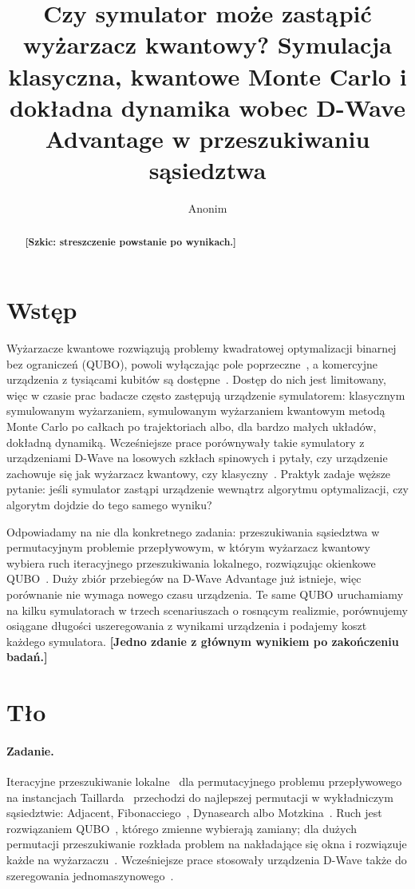 \documentclass[11pt]{article}
\title{Czy symulator może zastąpić wyżarzacz kwantowy? Symulacja klasyczna,
kwantowe Monte Carlo i dokładna dynamika wobec D-Wave Advantage
w przeszukiwaniu sąsiedztwa}
\author{Anonim}
\date{}
\newcommand{\tofill}[1]{\textbf{[#1]}}
\begin{document}
\maketitle

\begin{abstract}
\tofill{Szkic: streszczenie powstanie po wynikach.}
\end{abstract}

\section{Wstęp}

Wyżarzacze kwantowe rozwiązują problemy kwadratowej optymalizacji binarnej
bez ograniczeń (QUBO), powoli wyłączając pole poprzeczne~\cite{kadowaki1998,albash2018aqc},
a komercyjne urządzenia z tysiącami kubitów są
dostępne~\cite{johnson2011manufactured}. Dostęp do nich jest limitowany, więc
w czasie prac badacze często zastępują urządzenie symulatorem: klasycznym
symulowanym wyżarzaniem, symulowanym wyżarzaniem kwantowym metodą Monte Carlo
po całkach po trajektoriach albo, dla bardzo małych układów, dokładną
dynamiką. Wcześniejsze prace porównywały takie symulatory z urządzeniami
D-Wave na losowych szkłach spinowych i pytały, czy urządzenie zachowuje się
jak wyżarzacz kwantowy, czy klasyczny~\cite{boixo2014evidence,ronnow2014speedup}.
Praktyk zadaje węższe pytanie: jeśli symulator zastąpi urządzenie wewnątrz
algorytmu optymalizacji, czy algorytm dojdzie do tego samego wyniku?

Odpowiadamy na nie dla konkretnego zadania: przeszukiwania sąsiedztwa
w permutacyjnym problemie przepływowym, w którym wyżarzacz kwantowy wybiera
ruch iteracyjnego przeszukiwania lokalnego, rozwiązując okienkowe
QUBO~\cite{wojewodzki2026windowed,wojewodzki2026bpasts}. Duży zbiór przebiegów
na D-Wave Advantage już istnieje, więc porównanie nie wymaga nowego czasu
urządzenia. Te same QUBO uruchamiamy na kilku symulatorach w trzech
scenariuszach o rosnącym realizmie, porównujemy osiągane długości
uszeregowania z wynikami urządzenia i podajemy koszt każdego symulatora.
\tofill{Jedno zdanie z głównym wynikiem po zakończeniu badań.}

\section{Tło}

\paragraph{Zadanie.}
Iteracyjne przeszukiwanie lokalne~\cite{lourenco2003} dla permutacyjnego
problemu przepływowego na instancjach Taillarda~\cite{taillard1993} przechodzi
do najlepszej permutacji w wykładniczym sąsiedztwie: Adjacent,
Fibonacciego~\cite{bozejko2026new}, Dynasearch albo
Motzkina~\cite{wojewodzki2026soco}. Ruch jest rozwiązaniem
QUBO~\cite{lucas2014ising,glover2019}, którego zmienne wybierają zamiany; dla
dużych permutacji przeszukiwanie rozkłada problem na nakładające się okna
i rozwiązuje każde na wyżarzaczu~\cite{wojewodzki2026windowed}. Wcześniejsze
prace stosowały urządzenia D-Wave także do szeregowania
jednomaszynowego~\cite{bozejko2022distributed}.
\end{document}
